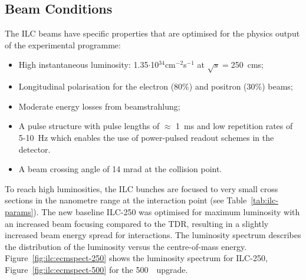 \subsection{Beam Conditions} \label{sec:beam:conditions}
The ILC beams have specific properties that are optimised for the physics output of the experimental programme:
\begin{itemize}
\item High instantaneous luminosity: 1.35$\cdot$10$^{34}$cm$^{-2}$s$^{-1}$ at $\sqrt{s}=$250~\GeV cms;
\item Longitudinal polarisation for the electron (80\%) and positron (30\%) beams;
\item Moderate energy losses from beamstrahlung;
\item A pulse structure with pulse lengths of $\approx$ 1~ms and low repetition rates of 5-10~Hz which enables the use of power-pulsed readout schemes in the detector.
\item A beam crossing angle of 14 mrad at the collision point.
\end{itemize}
To reach high luminosities, the ILC bunches are focused to very small cross sections in the nanometre range at the interaction point (see Table~\ref{tab:ilc-params}). The new baseline ILC-250 was optimised for maximum luminosity with an increased beam focusing compared to the TDR, resulting in a slightly increased beam energy spread for interactions. The luminosity spectrum describes the distribution of the luminosity versus the centre-of-mass energy. Figure~\ref{fig:ilc:ecmspect-250} shows the luminosity spectrum for ILC-250, Figure~\ref{fig:ilc:ecmspect-500} for the 500~\GeV~upgrade.

